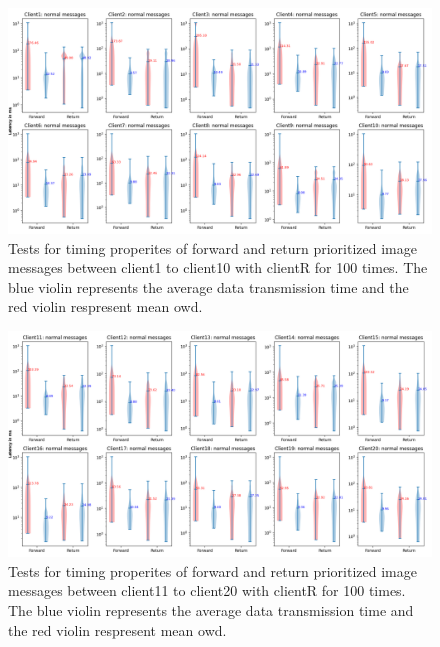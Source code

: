 \begin{figure}
    \centering
    \includegraphics[width=\textheight]{figures/appendix/priority_tests/log_violin_50clients_image_figure_1.png}\hfill 
    \caption{Tests for timing properites of forward and return prioritized image messages between client1 to client10 
    with clientR for 100 times. The blue violin represents the average data transmission time and the red violin 
    respresent mean \gls{owd}.} \label{fig: priority-50clients-image-a}
\end{figure}

\begin{figure}
    \includegraphics[width=\textheight]{figures/appendix/priority_tests/log_violin_50clients_image_figure_2.png}\hfill 
    \caption{Tests for timing properites of forward and return prioritized image messages between client11 to client20 
    with clientR for 100 times. The blue violin represents the average data transmission time and the red violin 
    respresent mean \gls{owd}.} \label{fig: priority-50clients-image-b}
\end{figure}

